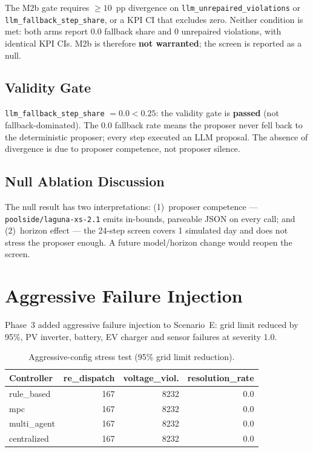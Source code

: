 The M2b gate requires $\geq 10$~pp divergence on
\texttt{llm\_unrepaired\_violations} or \texttt{llm\_fallback\_step\_share},
or a KPI CI that excludes zero. Neither condition is met: both arms report
0.0 fallback share and 0 unrepaired violations, with identical KPI CIs.
M2b is therefore \textbf{not warranted}; the screen is reported as a null.

\subsection{Validity Gate}

\texttt{llm\_fallback\_step\_share} $= 0.0 < 0.25$: the validity gate is
\textbf{passed} (not fallback-dominated). The 0.0 fallback rate means the
proposer never fell back to the deterministic proposer; every step executed an
LLM proposal. The absence of divergence is due to proposer competence, not
proposer silence.

\subsection{Null Ablation Discussion}

The null result has two interpretations: (1)~proposer competence ---
\texttt{poolside/laguna-xs-2.1} emits in-bounds, parseable JSON on every call;
and (2)~horizon effect --- the 24-step screen covers 1 simulated day and does
not stress the proposer enough. A future model/horizon change would reopen the
screen.

\section{Aggressive Failure Injection}\label{sec:aggressive}

Phase~3 added aggressive failure injection to Scenario~E: grid limit reduced by
95\%, PV inverter, battery, EV charger and sensor failures at severity 1.0.

\begin{table}[t]
\centering
\caption{Aggressive-config stress test (95\% grid limit reduction).}
\label{tab:aggressive}
\small
\begin{tabular}{lrrr}
\toprule
Controller & re\_dispatch & voltage\_viol. & resolution\_rate \\
\midrule
rule\_based & 167 & 8232 & 0.0 \\
mpc & 167 & 8232 & 0.0 \\
multi\_agent & 167 & 8232 & 0.0 \\
centralized & 167 & 8232 & 0.0 \\
\bottomrule
\end{tabular}
\end{table}

